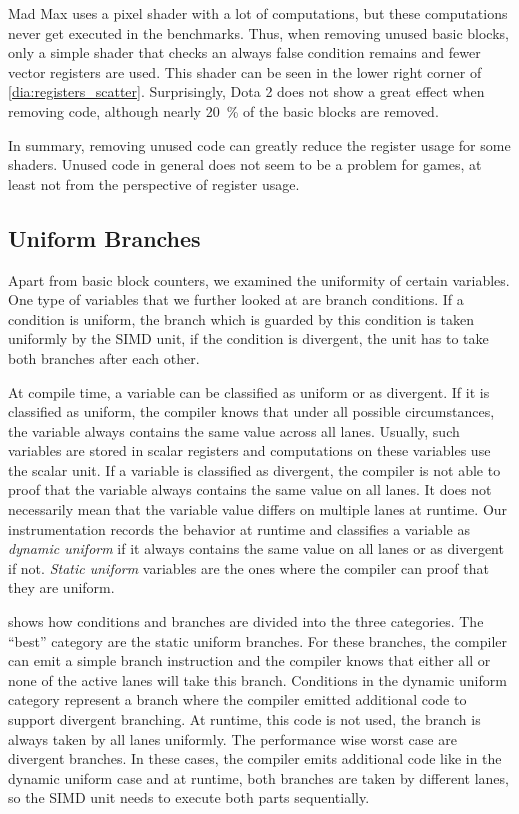 Mad Max uses a pixel shader with a lot of computations, but these computations never get executed in the benchmarks.
Thus, when removing unused basic blocks, only a simple shader that checks an always false condition remains and fewer vector registers are used.
This shader can be seen in the lower right corner of \cref{dia:registers_scatter}.
Surprisingly, Dota 2 does not show a great effect when removing code, although nearly \SI{20}{\percent} of the basic blocks are removed.

In summary, removing unused code can greatly reduce the register usage for some shaders.
Unused code in general does not seem to be a problem for games, at least not from the perspective of register usage.

\subsection{Uniform Branches}
\label{sub:eval_uniform_branches}
Apart from basic block counters, we examined the uniformity of certain variables.
One type of variables that we further looked at are branch conditions.
If a condition is uniform, the branch which is guarded by this condition is taken uniformly by the SIMD unit, if the condition is divergent, the unit has to take both branches after each other.

At compile time, a variable can be classified as uniform or as divergent.
If it is classified as uniform, the compiler knows that under all possible circumstances, the variable always contains the same value across all lanes.
Usually, such variables are stored in scalar registers and computations on these variables use the scalar unit.
If a variable is classified as divergent, the compiler is not able to proof that the variable always contains the same value on all lanes.
It does not necessarily mean that the variable value differs on multiple lanes at runtime.
Our instrumentation records the behavior at runtime and classifies a variable as \emph{dynamic uniform} if it always contains the same value on all lanes or as divergent if not.
\emph{Static uniform} variables are the ones where the compiler can proof that they are uniform.



 shows how conditions and branches are divided into the three categories.
The \enquote{best} category are the static uniform branches.
For these branches, the compiler can emit a simple branch instruction and the compiler knows that either all or none of the active lanes will take this branch.
Conditions in the dynamic uniform category represent a branch where the compiler emitted additional code to support divergent branching.
At runtime, this code is not used, the branch is always taken by all lanes uniformly.
The performance wise worst case are divergent branches.
In these cases, the compiler emits additional code like in the dynamic uniform case and at runtime, both branches are taken by different lanes, so the SIMD unit needs to execute both parts sequentially.


